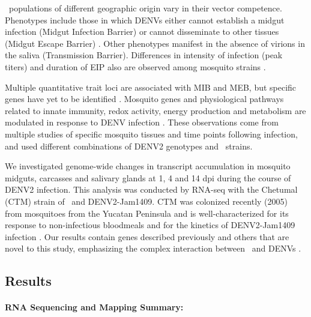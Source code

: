 \Aea\ populations of different geographic origin vary in their vector competence.
Phenotypes include those in which \gls{DENV}s either cannot establish a midgut infection (Midgut Infection Barrier) or cannot disseminate to other tissues (Midgut Escape Barrier) \cite{Black2002,Gubler1976,Cox2011}.
Other phenotypes manifest in the absence of virions in the saliva (Transmission Barrier).
Differences in intensity of infection (peak titers) and duration of \gls{EIP} also are observed among mosquito strains \cite{Salazar2007}.

Multiple quantitative trait loci are associated with MIB and MEB, but specific genes have yet to be identified \cite{Black2002}.
Mosquito genes and physiological pathways related to innate immunity, redox activity, energy production and metabolism are modulated in response to \gls{DENV} infection \cite{Xi2008,Sanchez-Vargas2009,Sim2010,Tchankouo-Nguetcheu2010,Luplertlop2011,Behura2011,Sim2012,Colpitts2011}.
These observations come from multiple studies of specific mosquito tissues and time points following infection, and used different combinations of \gls{DENV}2 genotypes and \Aa\ strains.

We investigated genome-wide changes in transcript accumulation in mosquito midguts, carcasses and salivary glands at 1, 4 and 14 \gls{dpi} during the course of \gls{DENV}2 infection.
This analysis was conducted by RNA-seq with the Chetumal (CTM) strain of \Aa\ and \gls{DENV}2-Jam1409.
\gls{CTM} was colonized recently (2005) from mosquitoes from the Yucatan Peninsula and is well-characterized for its response to non-infectious bloodmeals and for the kinetics of \gls{DENV}2-Jam1409 infection \cite{Salazar2007,Bernhardt2012,bonizzoni2012strain}.
Our results contain genes described previously and others that are novel to this study, emphasizing the complex interaction between \Aa\ and \gls{DENV}s \cite{Xi2008,Sim2010,Tchankouo-Nguetcheu2010,Luplertlop2011,Behura2011,Sim2012,Colpitts2011}.




\subsection{Results}
\paragraph*{RNA Sequencing and Mapping Summary:}

